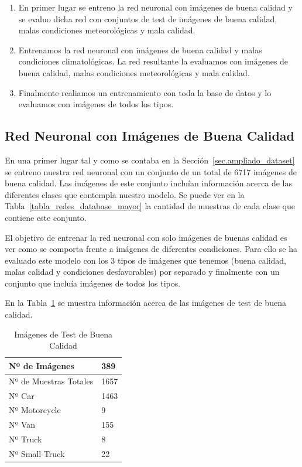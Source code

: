 \begin{enumerate}
    \item En primer lugar se entreno la red neuronal con imágenes de buena calidad y se evaluo dicha red con  conjuntos de test de imágenes de buena calidad, malas condiciones meteorológicas y mala calidad.
    \item Entrenamos la red neuronal con imágenes de buena calidad y malas condiciones climatológicas. La red resultante la evaluamos con imágenes de buena calidad, malas condiciones meteorológicas y mala calidad.
    \item Finalmente realiamos un entrenamiento con toda la base de datos y lo evaluamos con imágenes de todos los tipos.
\end{enumerate}

\subsection{Red Neuronal con Imágenes de Buena Calidad}

En una primer lugar tal y como se contaba en la Sección~\ref{sec.ampliado_dataset} se entreno nuestra red neuronal con un conjunto de un total de 6717 imágenes de buena calidad. Las imágenes de este conjunto incluían información acerca de las diferentes clases que contempla nuestro modelo. Se puede ver en la Tabla~\ref{tabla_redes_database_mayor} la cantidad de muestras de cada clase que contiene este conjunto.

El objetivo de entrenar la red neuronal con solo imágenes de buenas calidad es ver como se comporta frente a imágenes de diferentes condiciones. Para ello se ha evaluado este modelo con los 3 tipos de imágenes que tenemos (buena calidad, malas calidad y condiciones desfavorables) por separado y finalmente con un conjunto que incluía imágenes de todos los tipos.

En la Tabla~\ref{tab_img_test_buenas} se muestra información acerca de las imágenes de test de buena calidad.
\begin{table}[htbp]
\begin{center}
\begin{tabular}{|l|l|}
\hline
Nº de Imágenes  & 389 \\
\hline \hline
Nº de Muestras Totales & 1657\\ \hline
Nº Car & 1463 \\ \hline
Nº Motorcycle & 9 \\ \hline
Nº Van & 155 \\ \hline
Nº Truck & 8 \\ \hline
Nº Small-Truck & 22 \\ \hline
\end{tabular}
\caption{Imágenes de Test de Buena Calidad}
\label{tab_img_test_buenas}
\end{center}
\end{table}

